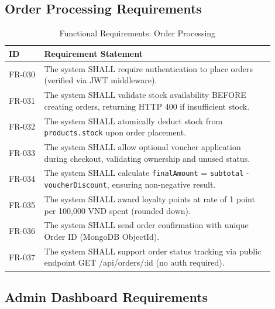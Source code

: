 \documentclass[12pt, a4paper]{report}
\begin{document}
\subsection{Order Processing Requirements}

\begin{table}[H]
\centering
\caption{Functional Requirements: Order Processing}
\label{tab:fr_orders}
\small
\begin{tabular}{@{}p{0.12\linewidth}p{0.78\linewidth}@{}}
\toprule
\textbf{ID} & \textbf{Requirement Statement} \\
\midrule
FR-030 & The system SHALL require authentication to place orders (verified via JWT middleware). \\
FR-031 & The system SHALL validate stock availability BEFORE creating orders, returning HTTP 400 if insufficient stock. \\
FR-032 & The system SHALL atomically deduct stock from \texttt{products.stock} upon order placement. \\
FR-033 & The system SHALL allow optional voucher application during checkout, validating ownership and unused status. \\
FR-034 & The system SHALL calculate \texttt{finalAmount} = \texttt{subtotal} - \texttt{voucherDiscount}, ensuring non-negative result. \\
FR-035 & The system SHALL award loyalty points at rate of 1 point per 100,000 VND spent (rounded down). \\
FR-036 & The system SHALL send order confirmation with unique Order ID (MongoDB ObjectId). \\
FR-037 & The system SHALL support order status tracking via public endpoint GET /api/orders/:id (no auth required). \\
\bottomrule
\end{tabular}
\end{table}

\subsection{Admin Dashboard Requirements}
\end{document}
